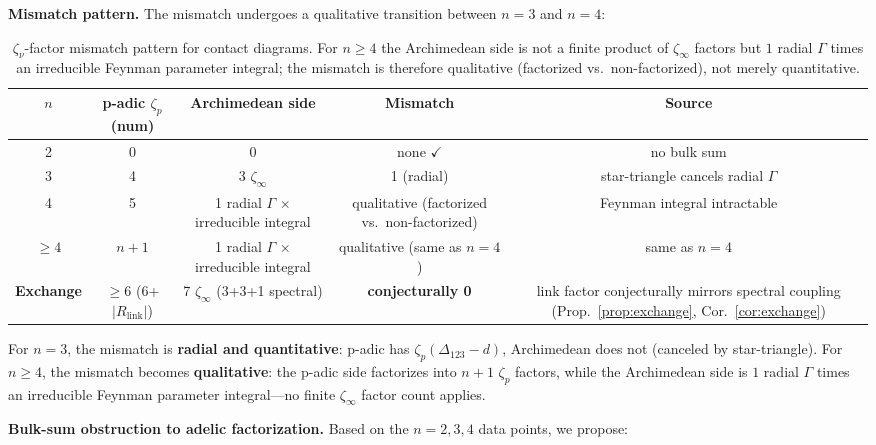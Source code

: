 \documentclass[11pt,a4paper]{article}
\begin{document}
\medskip\noindent
\textbf{Mismatch pattern.}
The mismatch undergoes a qualitative transition between $n = 3$ and $n = 4$:

\begin{table}[H]
\centering
\caption{$\zeta_\nu$-factor mismatch pattern for contact diagrams. For $n \geq 4$ the Archimedean side is not a finite product of $\zeta_\infty$ factors but $1$ radial $\Gamma$ times an irreducible Feynman parameter integral; the mismatch is therefore qualitative (factorized vs.\ non-factorized), not merely quantitative.}
\label{tab:mismatch}
\begin{tabular}{ccccc}
\toprule
$n$ & p-adic $\zeta_p$ (num) & Archimedean side & Mismatch & Source \\
\midrule
2 & 0 & 0 & none $\checkmark$ & no bulk sum \\
3 & 4 & 3 $\zeta_\infty$ & 1 (radial) & star-triangle cancels radial $\Gamma$ \\
4 & 5 & 1 radial $\Gamma$ $\times$ irreducible integral & qualitative (factorized vs.\ non-factorized) & Feynman integral intractable \\
$\geq 4$ & $n{+}1$ & 1 radial $\Gamma$ $\times$ irreducible integral & qualitative (same as $n=4$) & same as $n=4$ \\
\textbf{Exchange} & $\geq 6$ (6+$|R_{\mathrm{link}}|$) & 7 $\zeta_\infty$ (3+3+1 spectral) & \textbf{conjecturally 0} & link factor conjecturally mirrors spectral coupling (Prop.~\ref{prop:exchange}, Cor.~\ref{cor:exchange}) \\
\bottomrule
\end{tabular}
\end{table}

For $n = 3$, the mismatch is \textbf{radial and quantitative}: p-adic has $\zeta_p(\Delta_{123}{-}d)$, Archimedean does not (canceled by star-triangle). For $n \geq 4$, the mismatch becomes \textbf{qualitative}: the p-adic side factorizes into $n{+}1$ $\zeta_p$ factors, while the Archimedean side is $1$ radial $\Gamma$ times an irreducible Feynman parameter integral---no finite $\zeta_\infty$ factor count applies.

\medskip\noindent
\textbf{Bulk-sum obstruction to adelic factorization.}
Based on the $n = 2, 3, 4$ data points, we propose:
\end{document}
